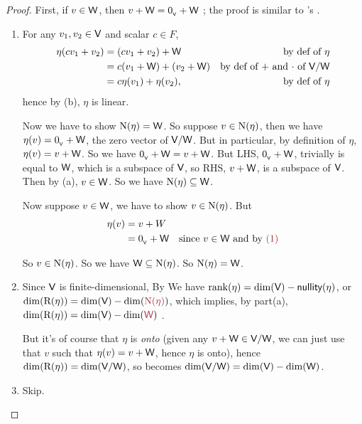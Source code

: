 \begin{proof}
First, if \(v \in \textsf{W}\), then \(v + \textsf{W} = 0_{_{\textsf{V}}} + \textsf{W}\) ;
the proof is similar to 's \RED{(*)}.
\begin{enumerate}
\item For any \(v_1, v_2 \in \textsf{V}\) and scalar \(c \in F\),
\begin{align*}
    \eta(c v_1 + v_2) & = (c v_1 + v_2) + \textsf{W} & \text{by def of \(\eta\)} \\
                      & = c(v_1 + \textsf{W}) + (v_2 + \textsf{W}) & \text{by def of \(+\) and \(\cdot\) of \(\textsf{V}/\textsf{W}\)} \\
                      & = c\eta(v_1) + \eta(v_2), & \text{by def of \(\eta\)}
\end{align*}
hence by (b), \(\eta\) is linear.

Now we have to show \(\mathrm{N}(\eta) = \textsf{W}\).
So suppose \(v \in \mathrm{N}(\eta)\), then we have \(\eta(v) = 0_{_{\textsf{V}}} + \textsf{W}\), the zero vector of \(\textsf{V}/\textsf{W}\).
But in particular, by definition of \(\eta\), \(\eta(v) = v + \textsf{W}\).
So we have \(0_{_{\textsf{V}}} + \textsf{W} = v + \textsf{W}\).
But LHS, \(0_{_{\textsf{V}}} + \textsf{W}\), trivially is equal to \(\textsf{W}\), which is a subspace of \(\textsf{V}\), so RHS, \(v + \textsf{W}\), is a subspace of \(\textsf{V}\).
Then by (a), \(v \in \textsf{W}\).
So we have \(\mathrm{N}(\eta) \subseteq \textsf{W}\).

Now suppose \(v \in \textsf{W}\), we have to show \(v \in \mathrm{N}(\eta)\).
But
\begin{align*}
    \eta(v) & = v + W \\
            & = \OV + \W & \text{since \(v \in \W\) and by \MAROON{(1)}}
\end{align*}

So \(v \in \mathrm{N}(\eta)\).
So we have \(\textsf{W} \subseteq \mathrm{N}(\eta)\).
So \(\mathrm{N}(\eta) = \textsf{W}\).

\item
Since \(\textsf{V}\) is finite-dimensional, By  We have \(\mathrm{rank}(\eta) = \dim(\textsf{V}) - \textsf{nullity}(\eta)\), or \(\dim(\RANGE(\eta)) = \dim(\V) - \dim(\MAROON{\NULL(\eta)})\), which implies, by part(a), \(\dim(\RANGE(\eta)) = \dim(\V) - \dim(\MAROON{\W})\) .

But it's of course that \(\eta\) is \emph{onto} (given any \(v + \textsf{W} \in \textsf{V}/\textsf{W}\), we can just use that \(v\) such that \(\eta(v) = v + \textsf{W}\), hence \(\eta\) is onto),
hence \(\dim(\mathrm{R}(\eta)) = \dim(\textsf{V}/\textsf{W})\), so  becomes \(\dim(\textsf{V}/\textsf{W}) = \dim(\textsf{V}) - \dim(\textsf{W})\).

\item Skip.
\end{enumerate}
\end{proof}


